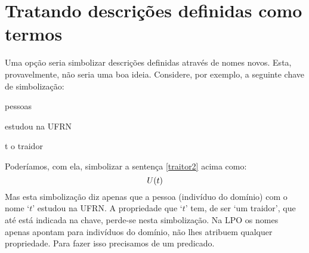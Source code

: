 \section[Descrições definidas como termos]{Tratando descrições definidas como termos}
Uma opção seria simbolizar descrições definidas através de nomes novos. Esta, provavelmente, não seria uma boa ideia.
Considere, por exemplo, a seguinte chave de simbolização:
\begin{center}
	\begin{ekey}
		\item[\text{domínio}] pessoas
		\item[\atom{U}{x}]  estudou na UFRN
		\item[t] o traidor
	\end{ekey}
\end{center}
Poderíamos, com ela, simbolizar a sentença \ref{traitor2} acima como:
$$\mathord{U}(t)$$
Mas esta simbolização diz apenas que a pessoa (indivíduo do domínio) com o nome `$t$' estudou na UFRN.
A propriedade que `$t$' tem, de ser `um traidor', que até está indicada na chave, perde-se nesta simbolização.
Na LPO os nomes apenas apontam para indivíduos do domínio, não lhes atribuem qualquer propriedade.
Para fazer isso precisamos de um predicado.

